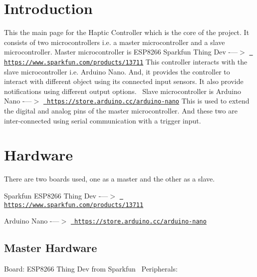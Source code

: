 \hypertarget{index_intro_sec}{}\section{Introduction}\label{index_intro_sec}
This the main page for the Haptic Controller which is the core of the project. It consists of two microcontrollers i.\+e. a master microcontroller and a slave microcontroller. Master microcontroller is E\+S\+P8266 Sparkfun Thing Dev -\/---$>$ \href{https://www.sparkfun.com/products/13711}{\texttt{ https\+://www.\+sparkfun.\+com/products/13711}} This controller interacts with the slave microcontroller i.\+e. Arduino Nano. And, it provides the controller to interact with different object using its connected input sensors. It also provide notifications using different output options.~\newline
Slave microcontroller is Arduino Nano -\/---$>$ \href{https://store.arduino.cc/arduino-nano}{\texttt{ https\+://store.\+arduino.\+cc/arduino-\/nano}} This is used to extend the digital and analog pins of the master microcontroller. And these two are inter-\/connected using serial communication with a trigger input.\hypertarget{index_hw_sec}{}\section{Hardware}\label{index_hw_sec}
There are two boards used, one as a master and the other as a slave.~\newline

\begin{DoxyEnumerate}
\item Sparkfun E\+S\+P8266 Thing Dev -\/---$>$ \href{https://www.sparkfun.com/products/13711}{\texttt{ https\+://www.\+sparkfun.\+com/products/13711}}
\item Arduino Nano -\/---$>$ \href{https://store.arduino.cc/arduino-nano}{\texttt{ https\+://store.\+arduino.\+cc/arduino-\/nano}} 
\end{DoxyEnumerate}\hypertarget{index_hw_sec1}{}\subsection{Master Hardware}\label{index_hw_sec1}
Board\+: E\+S\+P8266 Thing Dev from Sparkfun~\newline
Peripherals\+:~\newline

